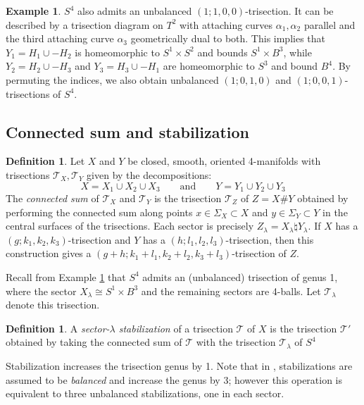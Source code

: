 \documentclass[11pt]{amsart}
\theoremstyle{definition}
\newtheorem{definition}[theorem]{Definition}
\newtheorem{example}[theorem]{Example}
\theoremstyle{remark}
\numberwithin{equation}{section}
\newcommand{\cT}{\mathcal{T}}
\begin{document}
\begin{example}
\label{ex:unbalanced-S4}
$S^4$ also admits an unbalanced $(1;1,0,0)$-trisection.  It can be described by a trisection diagram on $T^2$ with attaching curves $\alpha_1,\alpha_2$ parallel and the third attaching curve $\alpha_3$ geometrically dual to both.  This implies that $Y_1 = H_1 \cup -H_2$ is homeomorphic to $S^1 \times S^2$ and bounds $S^1 \times B^3$, while $Y_2 = H_2 \cup - H_3$ and $Y_3 = H_3 \cup -H_1$ are homeomorphic to $S^3$ and bound $B^4$.  By permuting the indices, we also obtain unbalanced $(1;0,1,0)$ and $(1;0,0,1)$-trisections of $S^4$.
\end{example}

\subsection{Connected sum and stabilization}

\begin{definition}
\label{def:connected-sum}
Let $X$ and $Y$ be closed, smooth, oriented 4-manifolds with trisections $\cT_X,\cT_Y$ given by the decompositions:
\[X = X_1 \cup X_2 \cup X_3 \qquad \text{and} \qquad Y = Y_1 \cup Y_2 \cup Y_3\]
The {\it connected sum} of $\cT_X$ and $\cT_Y$ is the trisection $\cT_Z$ of $Z = X \# Y$ obtained by performing the connected sum along points $x \in \Sigma_X \subset X$ and $y \in \Sigma_Y \subset Y$ in the central surfaces of the trisections.  Each sector is precisely $Z_{\lambda} =  X_{\lambda} \natural Y_{\lambda}$.  If $X$ has a $(g;k_1,k_2,k_3)$-trisection and $Y$ has a $(h;l_1,l_2,l_3)$-trisection, then this construction gives a $(g+h;k_1+l_1,k_2+l_2,k_3+l_3)$-trisection of $Z$.
\end{definition}

Recall from Example \ref{ex:unbalanced-S4} that $S^4$ admits an (unbalanced) trisection of genus 1, where the sector $X_{\lambda} \cong S^1 \times B^3$ and the remaining sectors are 4-balls.  Let $\cT_{\lambda}$ denote this trisection.

\begin{definition}
A {\it sector-$\lambda$ stabilization} of a trisection $\cT$ of $X$ is the trisection $\cT'$ obtained by taking the connected sum of $\cT$ with the trisection $\cT_{\lambda}$ of $S^4$
\end{definition}

Stabilization increases the trisection genus by 1.  Note that in \cite[Definition 8]{Gay-Kirby}, stabilizations are assumed to be {\it balanced} and increase the genus by 3;  however this operation is equivalent to three unbalanced stabilizations, one in each sector.
\end{document}
